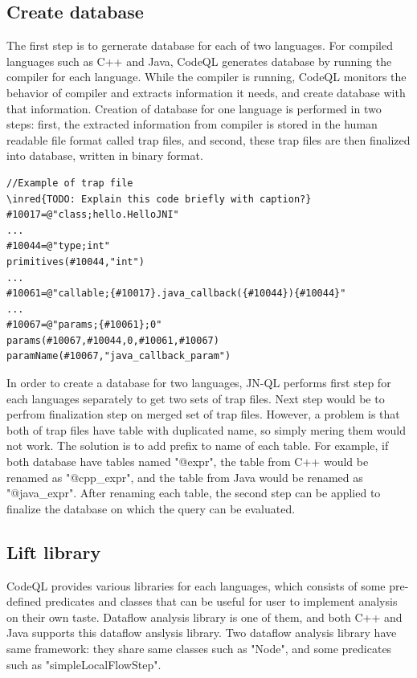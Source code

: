 \subsection{Create database}
The first step is to gernerate database for each of two languages.  For
compiled languages such as C++ and Java, CodeQL generates database by running
the compiler for each language. While the compiler is running, CodeQL monitors
the behavior of compiler and extracts information it needs, and create database
with that information.  Creation of database for one language is performed in
two steps: first, the extracted information from compiler is stored in the
human readable file format called trap files, and second, these trap files are
then finalized into database, written in binary format.

\begin{lstlisting}[xleftmargin=2.5em]
//Example of trap file
\inred{TODO: Explain this code briefly with caption?}
#10017=@"class;hello.HelloJNI"
...
#10044=@"type;int"
primitives(#10044,"int")
...
#10061=@"callable;{#10017}.java_callback({#10044}){#10044}"
...
#10067=@"params;{#10061};0"
params(#10067,#10044,0,#10061,#10067)
paramName(#10067,"java_callback_param")
\end{lstlisting}

In order to create a database for two languages, JN-QL performs first step for
each languages separately to get two sets of trap files.  Next step would be to
perfrom finalization step on merged set of trap files. However, a problem is that
both of trap files have table with duplicated name, so simply mering them would not work.
The solution is to add prefix to name of each table. For example, if both
database have tables named "@expr", the table from C++ would be renamed as
"@cpp\_expr", and the table from Java would be renamed as "@java\_expr". After
renaming each table, the second step can be applied to finalize the database on
which the query can be evaluated.

\subsection{Lift library}
CodeQL provides various libraries for each languages, which consists of some
pre-defined predicates and classes that can be useful for user to implement
analysis on their own taste. Dataflow analysis library is one of them, and both
C++ and Java supports this dataflow anslysis library. Two dataflow analysis
library have same framework: they share same classes such as "Node", and some
predicates such as "simpleLocalFlowStep".

